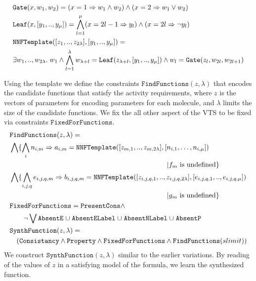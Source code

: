 
\begin{align*}
  &\texttt{Gate}( x, w_1, w_2 ) = ( x  = 1 \Rightarrow w_1  \land w_2 ) \land  
  ( x = 2  \Rightarrow w_1  \lor w_2 ) \\
  &\texttt{Leaf}( x, [y_1,..,y_\mu] ) =
  \bigwedge\limits_{l=1}^{\mu} ( x = 2l-1  \Rightarrow y_{l}) \land ( x = 2l  \Rightarrow \lnot y_{l})\\
  &\texttt{NNFTemplate}([z_1,..,z_{2\lambda}],[y_1,..,y_\mu] ) = \\
  &\exists w_1,..,w_{2\lambda}.\;w_1 \land \bigwedge_{l=1}^{\lambda} w_{\lambda+l} = \texttt{Leaf}( z_{\lambda+l}, [y_1,..,y_\mu] ) \land
  w_{l} = \texttt{Gate}( z_l, w_{2l},w_{2l+1})
\end{align*}

Using the template we define the constraints $\texttt{FindFunctions}(z,\lambda)$
that encodes the candidate functions that satisfy the activity requirements,
where $z$ is the vectors of parameters for encoding parameters
for each molecule,
and $\lambda$ limits the size of the candidate functions. 
%
We fix the all other aspect of the VTS to be fixed via constraints
$\texttt{FixedForFunctions}$.
%
\begin{align*}
  &\texttt{FindFunctions}(z,\lambda) =\\
  &\Land \{ \bigwedge\limits_{i} n_{i,m} \limplies a_{i,m} = 
  \texttt{NNFTemplate}([z_{m,1},..,z_{m,2\lambda}],[n_{i,1},\dots,n_{i,\mu}] ) \\
  & \hspace{8cm}|
  \nodef_m \text{ is undefined}\} \\
  &\Land \{ \bigwedge\limits_{i,j,q} e_{i,j,q,m} \limplies b_{i,j,q,m} = 
  \texttt{NNFTemplate}([z_{i,j,q,1},..,z_{i,j,q,2\lambda}],[e_{i,j,q,1},..,e_{i,j,q,\mu}] ) \\
  & \hspace{8cm} | \edgef_m \text{ is undefined}
  \}\\
  & \texttt{FixedForFunctions} = \texttt{PresentCons} \land\\
  & \quad \quad
\lnot \Lor \texttt{AbsentE} \;\union\; \texttt{AbsentELabel} \;\union\;
                    \texttt{AbsentNLabel} \;\union\;
                    \texttt{AbsentP}\\
  &\texttt{SynthFunction}(z,\lambda) = \\
  & \quad
    (  \texttt{Consistancy}\land \texttt{Property} \land
   \texttt{FixedForFunctions} \land \texttt{FindFunctions}(slimit) )
\end{align*}
We construct $\texttt{SynthFunction}(z,\lambda)$ similar to the earlier
variations.
%
By reading of the values of $z$ in a satisfying model of the formula,
we learn the synthesized function.

